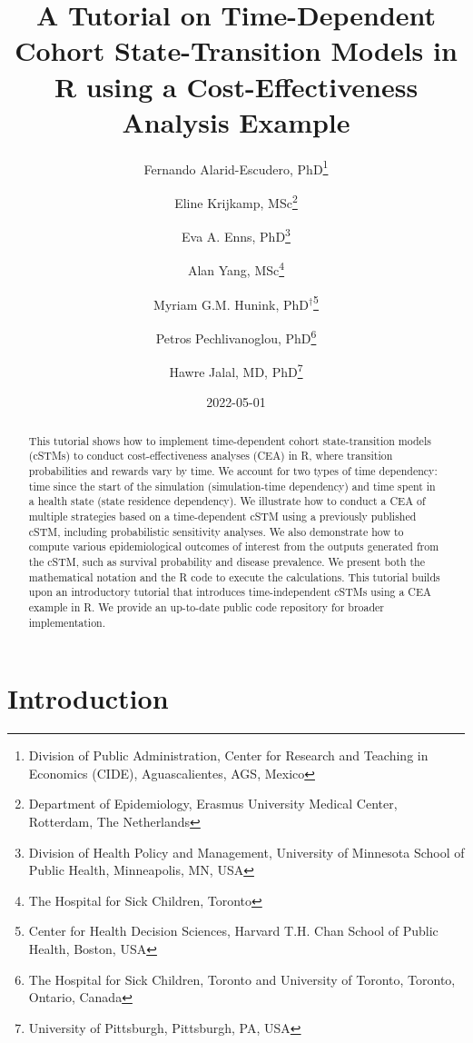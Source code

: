 \documentclass[
]{article}
\title{A Tutorial on Time-Dependent Cohort State-Transition Models in R using a Cost-Effectiveness Analysis Example}
\author{Fernando Alarid-Escudero, PhD\footnote{Division of Public Administration, Center for Research and Teaching in Economics (CIDE), Aguascalientes, AGS, Mexico} \and Eline Krijkamp, MSc\footnote{Department of Epidemiology, Erasmus University Medical Center, Rotterdam, The Netherlands} \and Eva A. Enns, PhD\footnote{Division of Health Policy and Management, University of Minnesota School of Public Health, Minneapolis, MN, USA} \and Alan Yang, MSc\footnote{The Hospital for Sick Children, Toronto} \and Myriam G.M. Hunink, PhD\(^\dagger\)\footnote{Center for Health Decision Sciences, Harvard T.H. Chan School of Public Health, Boston, USA} \and Petros Pechlivanoglou, PhD\footnote{The Hospital for Sick Children, Toronto and University of Toronto, Toronto, Ontario, Canada} \and Hawre Jalal, MD, PhD\footnote{University of Pittsburgh, Pittsburgh, PA, USA}}
\date{2022-05-01}
\begin{document}
\maketitle
\begin{abstract}
This tutorial shows how to implement time-dependent cohort state-transition models (cSTMs) to conduct cost-effectiveness analyses (CEA) in R, where transition probabilities and rewards vary by time. We account for two types of time dependency: time since the start of the simulation (simulation-time dependency) and time spent in a health state (state residence dependency). We illustrate how to conduct a CEA of multiple strategies based on a time-dependent cSTM using a previously published cSTM, including probabilistic sensitivity analyses. We also demonstrate how to compute various epidemiological outcomes of interest from the outputs generated from the cSTM, such as survival probability and disease prevalence. We present both the mathematical notation and the R code to execute the calculations. This tutorial builds upon an introductory tutorial that introduces time-independent cSTMs using a CEA example in R. We provide an up-to-date public code repository for broader implementation.
\end{abstract}

{
\setcounter{tocdepth}{2}
\tableofcontents
}
\hypertarget{introduction}{%
\section{Introduction}\label{introduction}}
\end{document}
